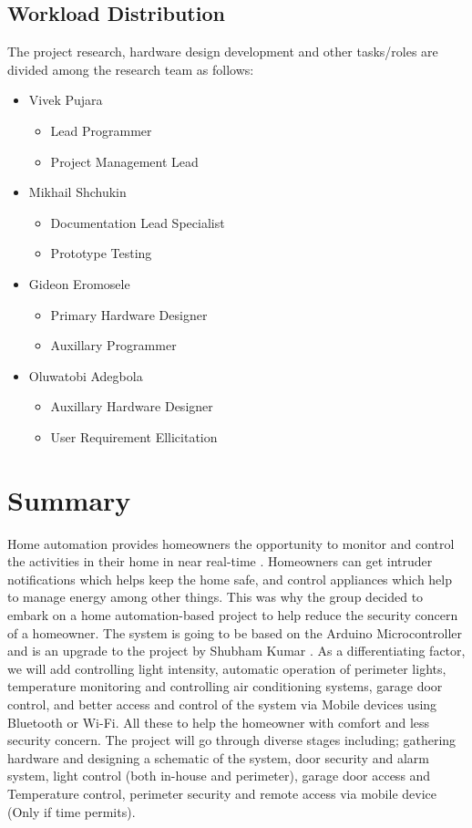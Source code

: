 \documentclass[journal]{IEEEtran}
\begin{document}
\subsection{Workload Distribution}
The project research, hardware design development and other tasks/roles are divided among the research team as follows:
\begin{itemize}
\item{Vivek Pujara}
	\begin{itemize}
	\item{Lead Programmer}
	\item{Project Management Lead}
	\end{itemize}
\item{Mikhail Shchukin}
	\begin{itemize}
	\item{Documentation Lead Specialist}
	\item{Prototype Testing}
	\end{itemize}
\item{Gideon Eromosele}
	\begin{itemize}
	\item{Primary Hardware Designer}
	\item{Auxillary Programmer}
	\end{itemize}
\item{Oluwatobi Adegbola}
	\begin{itemize}
	\item{Auxillary Hardware Designer}
	\item{User Requirement Ellicitation}
	\end{itemize}
\end{itemize}


\section{Summary}
Home automation provides homeowners the opportunity to monitor and control the activities in their home in near real-time \textsuperscript{\cite{IEEEhowto:Pavithra}}. Homeowners can get intruder notifications which helps keep the home safe, and control appliances which help to manage energy among other things. This was why the group decided to embark on a home automation-based project to help reduce the security concern of a homeowner. The system is going to be based on the Arduino Microcontroller and is an upgrade to the project by Shubham Kumar \textsuperscript{\cite{IEEEhowto:Kumar}}. As a differentiating factor, we will add controlling light intensity, automatic operation of perimeter lights, temperature monitoring and controlling air conditioning systems, garage door control, and better access and control of the system via Mobile devices using Bluetooth or Wi-Fi. All these to help the homeowner with comfort and less security concern. The project will go through diverse stages including; gathering hardware and designing a schematic of the system, door security and alarm system, light control (both in-house and perimeter), garage door access and Temperature control, perimeter security and remote access via mobile device (Only if time permits).
\end{document}
